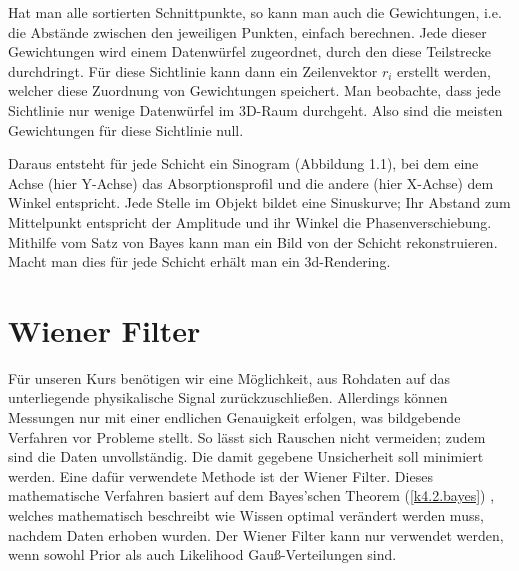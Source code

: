 \documentclass[]{dsadokumentation}
\begin{document}
Hat man alle sortierten Schnittpunkte, so kann man auch die Gewichtungen, i.e. die Abstände zwischen den jeweiligen Punkten, einfach berechnen. Jede dieser Gewichtungen wird einem Datenwürfel zugeordnet, durch den diese Teilstrecke durchdringt. Für diese Sichtlinie kann dann ein Zeilenvektor $r_i$ erstellt werden, welcher diese Zuordnung von Gewichtungen speichert. Man beobachte, dass jede Sichtlinie nur wenige Datenwürfel im 3D-Raum durchgeht. Also sind die meisten Gewichtungen für diese Sichtlinie null.

Daraus entsteht für jede Schicht ein Sinogram (Abbildung 1.1), bei dem eine Achse (hier Y-Achse) das Absorptionsprofil und die andere (hier X-Achse) dem Winkel entspricht. Jede Stelle im Objekt bildet eine Sinuskurve; Ihr Abstand zum Mittelpunkt entspricht der Amplitude und ihr Winkel die Phasenverschiebung. Mithilfe vom Satz von Bayes kann man ein Bild von der Schicht rekonstruieren. Macht man dies für jede Schicht erhält man ein 3d-Rendering.

\section{Wiener Filter}\label{k4.2.wiener.filter}

Für unseren Kurs benötigen wir eine Möglichkeit, aus Rohdaten auf das unterliegende physikalische Signal zurückzuschließen. Allerdings können Messungen nur mit einer endlichen Genauigkeit erfolgen, was bildgebende Verfahren vor Probleme stellt. So lässt sich Rauschen nicht vermeiden; zudem sind die Daten unvollständig. Die damit gegebene Unsicherheit soll minimiert werden. Eine dafür verwendete Methode ist der Wiener Filter.
Dieses mathematische Verfahren basiert auf dem Bayes'schen Theorem
(\ref{k4.2.bayes})
, welches mathematisch beschreibt wie Wissen optimal verändert werden muss, nachdem Daten erhoben wurden. Der Wiener Filter kann nur verwendet werden, wenn sowohl Prior als auch Likelihood Gauß-Verteilungen sind.
\end{document}
